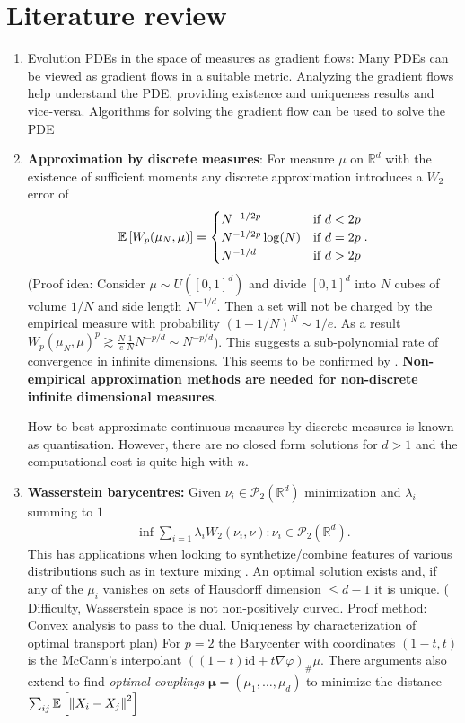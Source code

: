 \documentclass[
    a4paper,
    DIV=14,
    abstract=true,
    numbers=noenddot
]
{scrartcl}
\theoremstyle{definition}
\renewcommand{\b}[1]{{\bm{#1}}}
\renewcommand{\norm}[1]{\left\lVert #1 \right\rVert}\renewcommand{\abs}[1]{\left| #1 \right|}
\newcommand{\rmm}[1]{\mathrm{#1}}
\newcommand{\E}{\mathbb{E}}
\newcommand{\R}{\mathbb{R}}
\newcommand{\Pp}{\mathcal{P}}
\begin{document}
\section{Literature review}
\begin{enumerate}
    \item {Evolution PDEs in the space of measures as gradient flows}: Many PDEs can be viewed as gradient flows in a suitable metric. Analyzing the gradient flows help understand the PDE, providing existence and uniqueness results and vice-versa. Algorithms for solving the gradient flow can be used to solve the PDE
    \item \textbf{Approximation by discrete measures}: For measure $\mu$ on $\R^d$  with the existence of sufficient moments any discrete approximation introduces a $W_2$ error of \cite{fournier2015rate}
\begin{align*}
\E\qb{W_p(\mu_N, \mu ) }  = \begin{cases}
       N^{-1/2p}  & \text{if } d<2p \\
        N^{-1/2p}\log(N) & \text{if } d=2p\\
        N^{-1/d} & \text{if } d>2p\\
    \end{cases}. 
\end{align*}
(Proof idea:  Consider $\mu \sim U([0,1]^d)$ and divide $[0,1]^d$ into $N$  cubes of volume $1/N$ and side length $N ^{-1/d}$. Then a set will not be charged by the empirical measure with probability $(1-1/N)^N \sim 1/e$. As a result $W_p(\mu _N,\mu )^p\gtrsim \frac{N}{e} \frac{1}{N} N ^{-p/d} \sim N ^{-p/d} $). This suggests a sub-polynomial rate of convergence in infinite dimensions. This seems to be confirmed by \cite{lei2020convergence}. \textbf{Non-empirical approximation methods are needed for non-discrete infinite dimensional measures}. 

How to best approximate continuous measures by discrete measures is known as quantisation. However, there are no closed form solutions for $d>1$ and the computational cost is quite high with $n$.  
\item \textbf{ Wasserstein barycentres:} Given $\nu _i \in \Pp _2(\R^d)$ minimization and $\lambda_i$ summing to $1$    
\begin{align*}
   \inf{\sum_{i=1} \lambda_i W_2(\nu _i,\nu ): \nu_i \in \Pp_2(\R^d)}.
\end{align*}
This has applications when looking to synthetize/combine features of various distributions such as in texture mixing \cite{rabin2011wasserstein}.
An optimal solution exists and, if any of the $\mu_i$ vanishes on sets of Hausdorff dimension $ \leq d-1$ it is unique.
( Difficulty, Wasserstein space is not non-positively curved. Proof method: Convex analysis to pass to the dual. Uniqueness by characterization of optimal transport plan) For $p=2$ the Barycenter with coordinates $(1-t,t)$ is the McCann's interpolant $((1-t)\rmm{id} +t \nabla \varphi)_{\#} \mu $. There arguments also extend to find \emph{optimal couplings} $\b{\mu }=(\mu_1, \ldots, \mu _d)$ to minimize the distance $\sum_{ij} \E\qb{\norm{X_i-X_j}^2}  $   


\end{enumerate}
\end{document}
